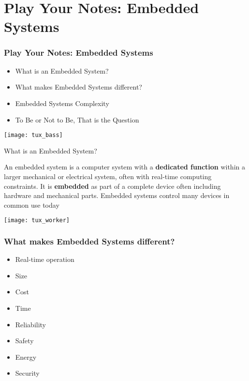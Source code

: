 \section{Play Your Notes: Embedded Systems}

\begin{frame}
  \frametitle{Play Your Notes: Embedded Systems}
  
  \begin{itemize}
      \item What is an Embedded System?
      \item What makes Embedded Systems different?
      \item Embedded Systems Complexity
      \item To Be or Not to Be, That is the Question
  \end{itemize}
  
    \centering
  \texttt{[image: tux\_bass]}

\end{frame}


\begin{frame}{What is an Embedded System?}

    \begin{block}{}
        An embedded system is a computer system with a \textbf{dedicated function} within a larger mechanical or electrical system, often with real-time computing constraints. It is \textbf{embedded} as part of a complete device often including hardware and mechanical parts. Embedded systems control many devices in common use today
    \end{block}
    
        \centering
  \texttt{[image: tux\_worker]}
    
    
\end{frame}


\begin{frame}
  \frametitle{What makes Embedded Systems different?}
  
  \begin{itemize}
      \item Real-time operation
        \item Size
        \item Cost
        \item Time
        \item Reliability
        \item Safety
        \item Energy
        \item Security
  \end{itemize}
\end{frame}

